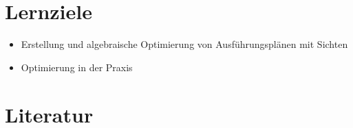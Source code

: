 \section*{Lernziele}

\begin{itemize}
  \item Erstellung und algebraische Optimierung von Ausführungsplänen mit Sichten
  \item Optimierung in der Praxis
\end{itemize}

\section*{Literatur}




\NeumannFifteen
